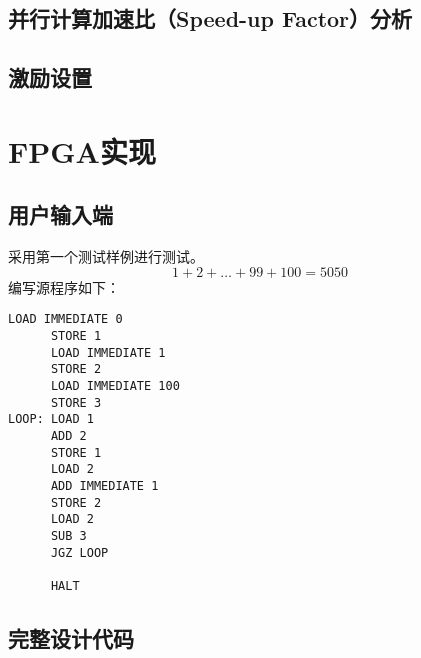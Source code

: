 \documentclass[lang=cn,a4paper,newtx]{elegantpaper}
\begin{document}
\subsection{并行计算加速比（Speed-up Factor）分析}
\subsection{激励设置}

\section{FPGA实现}
\subsection{用户输入端}
采用第一个测试样例进行测试。
$$
1+2+\dots +99 +100 =5050
$$
编写源程序如下：
\begin{lstlisting}[language=Assembly]
      LOAD IMMEDIATE 0 
      STORE 1
      LOAD IMMEDIATE 1
      STORE 2
      LOAD IMMEDIATE 100
      STORE 3
LOOP: LOAD 1
      ADD 2
      STORE 1
      LOAD 2
      ADD IMMEDIATE 1
      STORE 2
      LOAD 2
      SUB 3
      JGZ LOOP

      HALT
\end{lstlisting}
\nocite{FPGA-CPU}

\printbibliography
\newpage
\addappheadtotoc
\begin{appendices}
  \section{完整设计代码}
\end{appendices}
\end{document}
